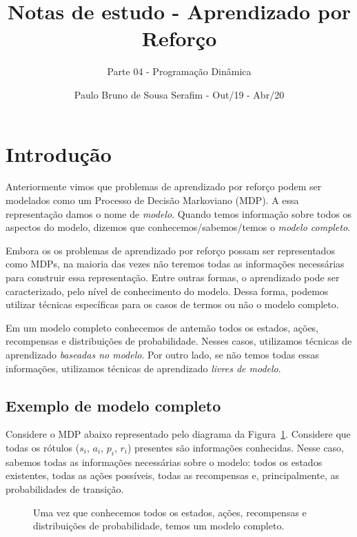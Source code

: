 \documentclass{article}
\title{Notas de estudo - Aprendizado por Reforço}
\author{Parte 04 - Programação Dinâmica}
\date{Paulo Bruno de Sousa Serafim - Out/19 - Abr/20}
\begin{document}
\maketitle

    \section{Introdução}

        Anteriormente vimos que problemas de aprendizado por reforço podem ser modelados como um Processo de Decisão Markoviano (MDP). A essa representação damos o nome de \emph{modelo}. Quando temos informação sobre todos os aspectos do modelo, dizemos que conhecemos/sabemos/temos o \emph{modelo completo}.

        Embora os os problemas de aprendizado por reforço possam ser representados como MDPs, na maioria das vezes não teremos todas as informações necessárias para construir essa representação. Entre outras formas, o aprendizado pode ser caracterizado, pelo nível de conhecimento do modelo. Dessa forma, podemos utilizar técnicas específicas para os casos de termos ou não o modelo completo.

        Em um modelo completo conhecemos de antemão todos os estados, ações, recompensas e distribuições de probabilidade. Nesses casos, utilizamos técnicas de aprendizado \emph{baseadas no modelo}. Por outro lado, se não temos todas essas informações, utilizamos técnicas de aprendizado \emph{livres de modelo}.

        \subsection{Exemplo de modelo completo}
    
            Considere o MDP abaixo representado pelo diagrama da Figura~\ref{diag:model-based}. Considere que todas os rótulos ($s_i$, $a_i$, $p_i$, $r_i$) presentes são informações conhecidas. Nesse caso, sabemos todas as informações necessárias sobre o modelo: todos os estados existentes, todas as ações possíveis, todas as recompensas e, principalmente, as probabilidades de transição.
            
            \begin{figure}[ht]
                \centering
                \mdpthreestate
                \caption{Uma vez que conhecemos todos os estados, ações, recompensas e distribuições de probabilidade, temos um modelo completo.}
                \label{diag:model-based}
            \end{figure}
            
\end{document}
